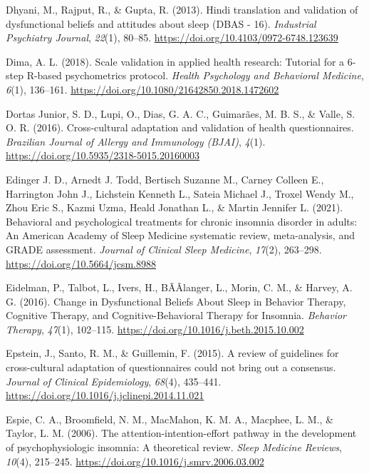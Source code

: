\documentclass[
  ,doc,11pt, twoside,floatsintext]{apa6}
\newlength{\cslhangindent}
\newlength{\cslentryspacingunit} %
\newenvironment{CSLReferences}[2] %
 {%
  \setlength{\parindent}{0pt}
  \ifodd #1
  \let\oldpar\par
  \def\par{\hangindent=\cslhangindent\oldpar}
  \fi
  \setlength{\parskip}{#2\cslentryspacingunit}
 }%
 {}
\begin{document}
\begin{CSLReferences}{1}{0}
\leavevmode{}%
Dhyani, M., Rajput, R., \& Gupta, R. (2013). Hindi translation and validation of dysfunctional beliefs and attitudes about sleep ({DBAS} - 16). \emph{Industrial Psychiatry Journal}, \emph{22}(1), 80--85. \url{https://doi.org/10.4103/0972-6748.123639}

\leavevmode{}%
Dima, A. L. (2018). Scale validation in applied health research: Tutorial for a 6-step {R-based} psychometrics protocol. \emph{Health Psychology and Behavioral Medicine}, \emph{6}(1), 136--161. \url{https://doi.org/10.1080/21642850.2018.1472602}

\leavevmode{}%
Dortas Junior, S. D., Lupi, O., Dias, G. A. C., Guimarães, M. B. S., \& Valle, S. O. R. (2016). {Cross-cultural adaptation and validation of health questionnaires}. \emph{Brazilian Journal of Allergy and Immunology (BJAI)}, \emph{4}(1). \url{https://doi.org/10.5935/2318-5015.20160003}

\leavevmode{}%
Edinger J. D., Arnedt J. Todd, Bertisch Suzanne M., Carney Colleen E., Harrington John J., Lichstein Kenneth L., Sateia Michael J., Troxel Wendy M., Zhou Eric S., Kazmi Uzma, Heald Jonathan L., \& Martin Jennifer L. (2021). Behavioral and psychological treatments for chronic insomnia disorder in adults: An {American Academy} of {Sleep Medicine} systematic review, meta-analysis, and {GRADE} assessment. \emph{Journal of Clinical Sleep Medicine}, \emph{17}(2), 263--298. \url{https://doi.org/10.5664/jcsm.8988}

\leavevmode{}%
Eidelman, P., Talbot, L., Ivers, H., BÃÂlanger, L., Morin, C. M., \& Harvey, A. G. (2016). Change in {Dysfunctional Beliefs About Sleep} in {Behavior Therapy}, {Cognitive Therapy}, and {Cognitive-Behavioral Therapy} for {Insomnia}. \emph{Behavior Therapy}, \emph{47}(1), 102--115. \url{https://doi.org/10.1016/j.beth.2015.10.002}

\leavevmode{}%
Epstein, J., Santo, R. M., \& Guillemin, F. (2015). A review of guidelines for cross-cultural adaptation of questionnaires could not bring out a consensus. \emph{Journal of Clinical Epidemiology}, \emph{68}(4), 435--441. \url{https://doi.org/10.1016/j.jclinepi.2014.11.021}

\leavevmode{}%
Espie, C. A., Broomfield, N. M., MacMahon, K. M. A., Macphee, L. M., \& Taylor, L. M. (2006). The attention-intention-effort pathway in the development of psychophysiologic insomnia: A theoretical review. \emph{Sleep Medicine Reviews}, \emph{10}(4), 215--245. \url{https://doi.org/10.1016/j.smrv.2006.03.002}


\end{CSLReferences}
\end{document}
